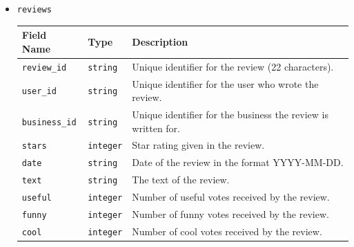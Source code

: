 \documentclass{Configuration_Files/PoliMi3i_thesis}
\begin{document}
\begin{itemize}
\item{\texttt{reviews}}
\begin{longtable}{|p{3cm}|p{2.5cm}|p{10cm}|}
\hline
\textbf{Field Name} & \textbf{Type} & \textbf{Description} \\ \hline
\texttt{review\_id} & \texttt{string} & Unique identifier for the review (22 characters). \\ \hline
\texttt{user\_id} & \texttt{string} & Unique identifier for the user who wrote the review. \\ \hline
\texttt{business\_id} & \texttt{string} & Unique identifier for the business the review is written for. \\ \hline
\texttt{stars} & \texttt{integer} & Star rating given in the review. \\ \hline
\texttt{date} & \texttt{string} & Date of the review in the format YYYY-MM-DD. \\ \hline
\texttt{text} & \texttt{string} & The text of the review. \\ \hline
\texttt{useful} & \texttt{integer} & Number of useful votes received by the review. \\ \hline
\texttt{funny} & \texttt{integer} & Number of funny votes received by the review. \\ \hline
\texttt{cool} & \texttt{integer} & Number of cool votes received by the review. \\ \hline
\end{longtable}


\end{itemize}
\end{document}
